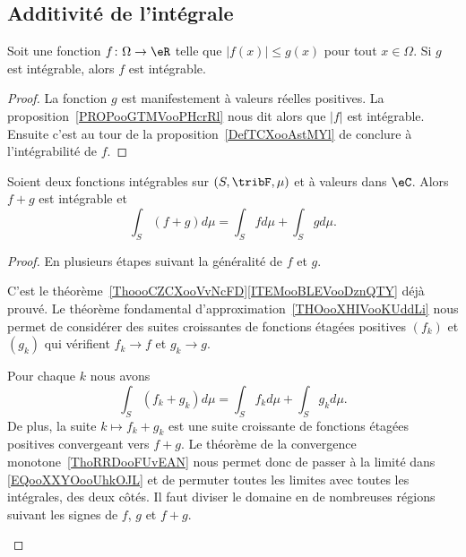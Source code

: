 \subsection{Additivité de l'intégrale}

\begin{lemma}   \label{LemPfHgal}
	Soit une fonction \( f\colon \Omega\to \eR\) telle que \( | f(x)|\leq g(x) \) pour tout \( x\in\Omega\). Si \( g\) est intégrable, alors \( f\) est intégrable.
\end{lemma}

\begin{proof}
	La fonction \( g\) est manifestement à valeurs réelles positives. La proposition~\ref{PROPooGTMVooPHcrRl} nous dit alors que \( | f |\) est intégrable. Ensuite c'est au tour de la proposition~\ref{DefTCXooAstMYl} de conclure à l'intégrabilité de \( f\).
\end{proof}

\begin{proposition}     \label{PROPooFIYEooCpdmwZ}
	Soient deux fonctions intégrables sur \( (S,\tribF,\mu)\) et à valeurs dans \( \eC\). Alors \( f+g\) est intégrable et
	\begin{equation}
		\int_S(f+g)d\mu=\int_Sfd\mu+\int_Sgd\mu.
	\end{equation}
\end{proposition}

\begin{proof}
	En plusieurs étapes suivant la généralité de \( f\) et \( g\).
	\begin{subproof}
		C'est le théorème~\ref{ThoooCZCXooVvNcFD}\ref{ITEMooBLEVooDznQTY} déjà prouvé.
		Le théorème fondamental d'approximation~\ref{THOooXHIVooKUddLi} nous permet de considérer des suites croissantes de fonctions étagées positives \( (f_k)\) et \( (g_k)\) qui vérifient \( f_k\to f\) et \( g_k\to g\).

		Pour chaque \( k\) nous avons
		\begin{equation}        \label{EQooXXYOooUhkOJL}
			\int_S(f_k+g_k)d\mu=\int_Sf_kd\mu+\int_Sg_kd\mu.
		\end{equation}
		De plus, la suite \( k\mapsto f_k+g_k\) est une suite croissante de fonctions étagées positives convergeant vers \( f+g\). Le théorème de la convergence monotone~\ref{ThoRRDooFUvEAN} nous permet donc de passer à la limité dans \eqref{EQooXXYOooUhkOJL} et de permuter toutes les limites avec toutes les intégrales, des deux côtés.
		Il faut diviser le domaine en de nombreuses régions suivant les signes de \( f\), \( g\) et \( f+g\).
	\end{subproof}
\end{proof}

